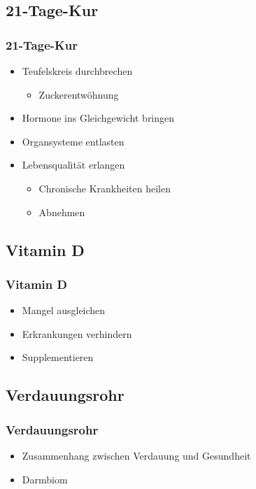 \documentclass[xcolor=dvipsnames]{beamer}
\begin{document}
    \subsection{21-Tage-Kur}
    \begin{frame}
        \frametitle{21-Tage-Kur}
        \begin{itemize}
            \setlength\itemsep{1em}
            \item Teufelskreis durchbrechen
            \begin{itemize}
                \item Zuckerentwöhnung
            \end{itemize}
            \item Hormone ins Gleichgewicht bringen
            \item Organsysteme entlasten
            \item Lebensqualität erlangen
            \begin{itemize}
                \item Chronische Krankheiten heilen
                \item Abnehmen
            \end{itemize}
        \end{itemize}
    \end{frame}

    \subsection{Vitamin D}
    \begin{frame}
        \frametitle{Vitamin D}
        \begin{itemize}
            \setlength\itemsep{1em}
            \item Mangel ausgleichen
            \item Erkrankungen verhindern
            \item Supplementieren
        \end{itemize}
    \end{frame}

    \subsection{Verdauungsrohr}
    \begin{frame}
        \frametitle{Verdauungsrohr}
        \begin{itemize}
            \setlength\itemsep{1em}
            \item Zusammenhang zwischen Verdauung und Gesundheit
            \item Darmbiom
        \end{itemize}
    \end{frame}
\end{document}
